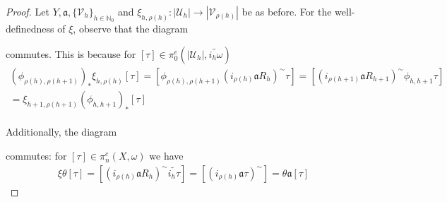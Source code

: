 \documentclass[a4paper,11pt]{article}
\theoremstyle{definition}
\theoremstyle{plain}
\theoremstyle{remark}
\begin{document}
{\begin{proof} Let $Y,\mathfrak{a}, \{\mathcal{V}_{h}\}_{h\in \mathbb{N}_{0}}$ and $\xi_{h,\rho(h)}: |\mathcal{U}_{h}|\rightarrow |\mathcal{V}_{\rho(h)}|$ be as before. For the well-definedness of $\xi$, observe that the diagram 

\begin{figure}[H]
\center
{}
\end{figure}
commutes. This is because for $[\tau]\in \pi_{0}^{e}(|\mathcal{U}_{h}|,\widetilde{i_{h}\omega})$
\begin{align*}
(\phi_{\rho(h),\rho(h+1)})_{\ast}\xi_{h,\rho(h)}[\tau] = [\phi_{\rho(h),\rho(h+1)}(i_{\rho(h)}\mathfrak{a}R_{h})^{\sim} \tau] = [(i_{\rho(h+1)}\mathfrak{a}R_{h+1})^{\sim}\phi_{h,h+1}\tau] \\
=\xi_{h+1,\rho(h+1)} (\phi_{h,h+1})_{\ast}[\tau] 
\end{align*}\\
Additionally, the diagram 
\begin{figure}[H]
\center
{}
\end{figure}
commutes: for $[\tau]\in \pi_{n}^{c}(X,\omega)$ we have
\begin{align*}
\xi \theta[\tau] = [(i_{\rho(h)}\mathfrak{a}R_{h})^{\sim}\widetilde{i_{h}\tau}] =[(i_{\rho(h)}\mathfrak{a}\tau)^{\sim}] = \theta \mathfrak{a}[\tau]
\end{align*} 
\end{proof}


}
\end{document}
